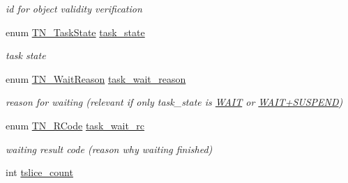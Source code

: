 \begin{DoxyCompactItemize}
\begin{DoxyCompactList}\small\item\em id for object validity verification \end{DoxyCompactList}\item 
\hypertarget{structTN__Task_a6a1ec466a27d43d68f21a62e2c6cf03d}{enum \hyperlink{tn__tasks_8h_a5e12e8a0ab280b515f44bf3fee1210a6}{T\+N\+\_\+\+Task\+State} \hyperlink{structTN__Task_a6a1ec466a27d43d68f21a62e2c6cf03d}{task\+\_\+state}}\label{structTN__Task_a6a1ec466a27d43d68f21a62e2c6cf03d}

\begin{DoxyCompactList}\small\item\em task state \end{DoxyCompactList}\item 
\hypertarget{structTN__Task_a37d3c12db92b7dfc6c3bb661216f3c11}{enum \hyperlink{tn__tasks_8h_a343b0332013c15d6e878c2f60ed2c9b7}{T\+N\+\_\+\+Wait\+Reason} \hyperlink{structTN__Task_a37d3c12db92b7dfc6c3bb661216f3c11}{task\+\_\+wait\+\_\+reason}}\label{structTN__Task_a37d3c12db92b7dfc6c3bb661216f3c11}

\begin{DoxyCompactList}\small\item\em reason for waiting (relevant if only {\ttfamily task\+\_\+state} is \hyperlink{tn__tasks_8h_a5e12e8a0ab280b515f44bf3fee1210a6aaa3dfaf2bb5992e0cef981618ce30d56}{{\ttfamily W\+A\+I\+T}} or \hyperlink{tn__tasks_8h_a5e12e8a0ab280b515f44bf3fee1210a6ad010070ccc16a5c706c286baf2e3ee2a}{{\ttfamily W\+A\+I\+T+\+S\+U\+S\+P\+E\+N\+D}}) \end{DoxyCompactList}\item 
\hypertarget{structTN__Task_a367b92b74248f8702ed428a695079903}{enum \hyperlink{tn__common_8h_aa43bd3da1ad4c1e61224b5f23b369876}{T\+N\+\_\+\+R\+Code} \hyperlink{structTN__Task_a367b92b74248f8702ed428a695079903}{task\+\_\+wait\+\_\+rc}}\label{structTN__Task_a367b92b74248f8702ed428a695079903}

\begin{DoxyCompactList}\small\item\em waiting result code (reason why waiting finished) \end{DoxyCompactList}\item 
\hypertarget{structTN__Task_ab3ca332d577071de47d85fb1371f6830}{int \hyperlink{structTN__Task_ab3ca332d577071de47d85fb1371f6830}{tslice\+\_\+count}}\label{structTN__Task_ab3ca332d577071de47d85fb1371f6830}


\end{DoxyCompactItemize}
